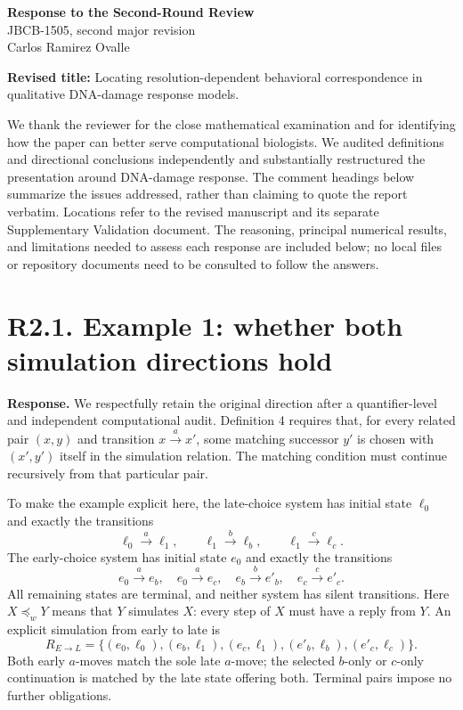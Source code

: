 \documentclass[11pt]{article}
\newcommand{\prew}{\mathrel{\preceq_w}}
\begin{document}
\begin{center}
{\Large\bfseries Response to the Second-Round Review}\\[6pt]
JBCB-1505, second major revision\\
Carlos Ramirez Ovalle
\end{center}

\textbf{Revised title:} Locating resolution-dependent behavioral correspondence
in qualitative DNA-damage response models.

We thank the reviewer for the close mathematical examination and for identifying
how the paper can better serve computational biologists. We audited definitions
and directional conclusions independently and substantially restructured the
presentation around DNA-damage response. The comment headings below summarize
the issues addressed, rather than claiming to quote the report verbatim.
Locations refer to the revised manuscript and its separate Supplementary
Validation document. The reasoning, principal numerical results, and limitations
needed to assess each response are included below; no local files or repository
documents need to be consulted to follow the answers.

\section*{R2.1. Example 1: whether both simulation directions hold}
\textbf{Response.} We respectfully retain the original direction after a
quantifier-level and independent computational audit. Definition 4 requires that,
for every related pair $(x,y)$ and transition $x\xrightarrow{a}x'$, some matching
successor $y'$ is chosen with $(x',y')$ itself in the simulation relation.
The matching condition must continue recursively from that particular pair.

To make the example explicit here, the late-choice system has initial state
$\ell_0$ and exactly the transitions
\[
\ell_0\xrightarrow{a}\ell_1,\qquad
\ell_1\xrightarrow{b}\ell_b,\qquad
\ell_1\xrightarrow{c}\ell_c.
\]
The early-choice system has initial state $e_0$ and exactly the transitions
\[
e_0\xrightarrow{a}e_b,\quad e_0\xrightarrow{a}e_c,\quad
e_b\xrightarrow{b}e'_b,\quad e_c\xrightarrow{c}e'_c.
\]
All remaining states are terminal, and neither system has silent transitions.
Here $X\prew Y$ means that $Y$ simulates $X$: every step of $X$ must have
a reply from $Y$. An explicit simulation from early to late is
\[
R_{E\to L}=\{(e_0,\ell_0),(e_b,\ell_1),(e_c,\ell_1),
(e'_b,\ell_b),(e'_c,\ell_c)\}.
\]
Both early $a$-moves match the sole late $a$-move; the selected $b$-only or
$c$-only continuation is matched by the late state offering both. Terminal
pairs impose no further obligations.
\end{document}
